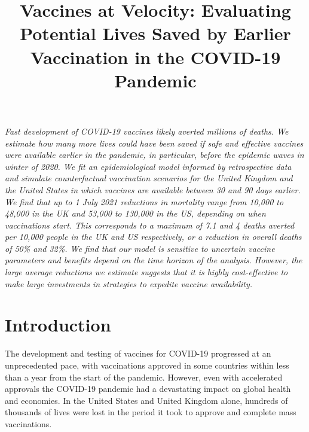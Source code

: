 \documentclass{article}
\title{Vaccines at Velocity: Evaluating Potential Lives Saved by Earlier Vaccination in the COVID-19 Pandemic}
\author{
  }
\begin{document}
\maketitle


\begin{abstract}

\end{abstract}


\emph{Fast development of COVID-19 vaccines likely averted millions of deaths. We estimate how many more lives could have been saved if safe and effective vaccines were available earlier in the pandemic, in particular, before the epidemic waves in winter of 2020. We fit an epidemiological model informed by retrospective data and simulate counterfactual vaccination scenarios for the United Kingdom and the United States in which vaccines are available between 30 and 90 days earlier. We find that up to 1 July 2021 reductions in mortality range from 10,000 to 48,000 in the UK and 53,000 to 130,000 in the US, depending on when vaccinations start. This corresponds to a maximum of 7.1 and 4 deaths averted per 10,000 people in the UK and US respectively, or a reduction in overall deaths of 50\% and 32\%. We find that our model is sensitive to uncertain vaccine parameters and benefits depend on the time horizon of the analysis. However, the large average reductions we estimate suggests that it is highly cost-effective to make large investments in strategies to expedite vaccine availability.}

\section{Introduction}\label{introduction}

The development and testing of vaccines for COVID-19 progressed at an unprecedented pace, with vaccinations approved in some countries within less than a year from the start of the pandemic. However, even with accelerated approvals the COVID-19 pandemic had a devastating impact on global health and economies. In the United States and United Kingdom alone, hundreds of thousands of lives were lost in the period it took to approve and complete mass vaccinations.
\end{document}
